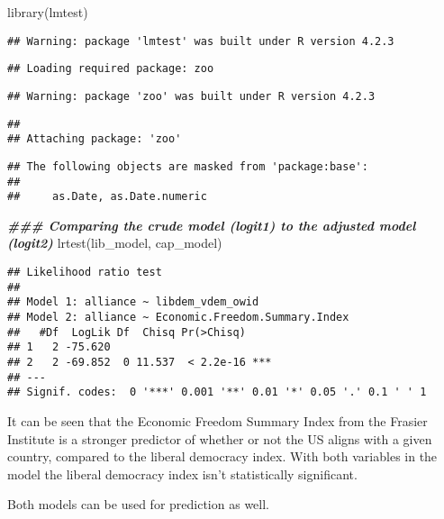 \documentclass[
]{article}
\newenvironment{Shaded}{\begin{snugshade}}{\end{snugshade}}
\newcommand{\DocumentationTok}[1]{\textcolor[rgb]{0.56,0.35,0.01}{\textbf{\textit{#1}}}}
\newcommand{\FunctionTok}[1]{\textcolor[rgb]{0.00,0.00,0.00}{#1}}
\newcommand{\NormalTok}[1]{#1}
\begin{document}
\begin{Shaded}
\begin{Highlighting}[]
\FunctionTok{library}\NormalTok{(lmtest)}
\end{Highlighting}
\end{Shaded}

\begin{verbatim}
## Warning: package 'lmtest' was built under R version 4.2.3
\end{verbatim}

\begin{verbatim}
## Loading required package: zoo
\end{verbatim}

\begin{verbatim}
## Warning: package 'zoo' was built under R version 4.2.3
\end{verbatim}

\begin{verbatim}
## 
## Attaching package: 'zoo'
\end{verbatim}

\begin{verbatim}
## The following objects are masked from 'package:base':
## 
##     as.Date, as.Date.numeric
\end{verbatim}

\begin{Shaded}
\begin{Highlighting}[]
\DocumentationTok{\#\#\# Comparing the crude model (logit1) to the adjusted model (logit2)}
\FunctionTok{lrtest}\NormalTok{(lib\_model, cap\_model)}
\end{Highlighting}
\end{Shaded}

\begin{verbatim}
## Likelihood ratio test
## 
## Model 1: alliance ~ libdem_vdem_owid
## Model 2: alliance ~ Economic.Freedom.Summary.Index
##   #Df  LogLik Df  Chisq Pr(>Chisq)    
## 1   2 -75.620                         
## 2   2 -69.852  0 11.537  < 2.2e-16 ***
## ---
## Signif. codes:  0 '***' 0.001 '**' 0.01 '*' 0.05 '.' 0.1 ' ' 1
\end{verbatim}

It can be seen that the Economic Freedom Summary Index from the Frasier
Institute is a stronger predictor of whether or not the US aligns with a
given country, compared to the liberal democracy index. With both
variables in the model the liberal democracy index isn't statistically
significant.

Both models can be used for prediction as well.
\end{document}
